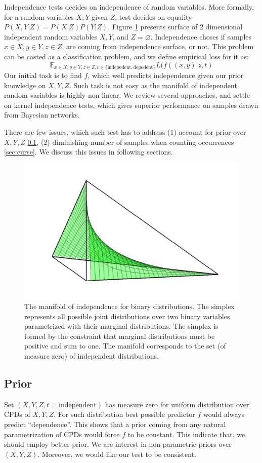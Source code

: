 \documentclass{article} %
\begin{document}
Independence tests decides on independence of random variables. More formally,
for a random variables $X, Y$ given $Z$, test decides on equality $P(X, Y| Z) = P(X | Z) P(Y | Z)$. 
Figure \ref{fig:ind} presents surface of $2$ dimensional independent 
random variables $X, Y$, and $Z = \varnothing$. Independence choses if samples $x \in X, y \in Y, z \in Z$, 
are coming from independence surface, or not. 
This problem can be casted as a classification problem, and we define
empirical loss for it as:
\begin{equation}
  \mathbb{E}_{x \in X, y \in Y, z \in Z, t \in \{\text{indepedent}, \text{depedent}\}} L(f((x, y)|z, t)
\end{equation}
Our initial task is to find $f$, which well predicts independence given our prior
knowledge on $X, Y, Z$. Such task is not easy as the manifold of independent
random variables is highly non-linear. We review several approaches, and 
settle on kernel independence tests, which gives superior performance on
samples drawn from Bayesian networks.


There are few issues, which such test has to address 
(1) account for prior over $X, Y, Z$ \ref{sec:prior}, (2) diminishing number of samples when
counting occurrences \ref{sec:curse}. We discuss this issues
in following sections. 


\begin{figure}[h]
\centering
\includegraphics[width=0.35\linewidth]{img/independence_surface-eps-converted-to-crop.pdf}
\caption{The manifold of independence for binary distributions. The simplex represents all possible joint distributions over two binary variables parametrized with their marginal distributions. The simplex is formed by the constraint that marginal distributions must be positive and sum to one.  The manifold corresponds to the set (of measure zero) of independent distributions.}
\label{fig:ind}
\end{figure}

\subsection{Prior}\label{sec:prior}
Set $(X, Y, Z, t=\text{independent})$ has measure zero for uniform
distribution over CPDs of $X, Y, Z$. For such distribution
best possible predictor $f$ would always predict ``dependence''. 
This shows that a prior coming from any natural parametrization
of CPDs would force $f$ to be constant. This indicate that, we should
employ better prior. We are interest in non-parametric priors over $(X, Y, Z)$.
Moreover, we would like our test to be consistent.
\end{document}
